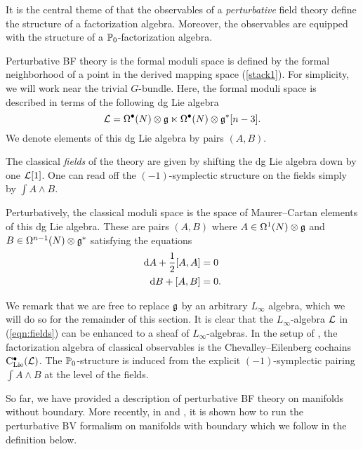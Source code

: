 \documentclass[11pt]{amsart}
\numberwithin{equation}{section}
\begin{document}
It is the central theme of \cite{CG1, CG2} that the observables of a {\em perturbative} field theory define the structure of a factorization algebra. 
Moreover, the observables are equipped with the structure of a $\mathbb P_0$-factorization algebra.

Perturbative BF theory is the formal moduli space is defined by the formal neighborhood of a point in the derived mapping space (\ref{stack1}). 
For simplicity, we will work near the trivial $G$-bundle. 
Here, the formal moduli space is described in terms of the following dg Lie algebra 
\begin{equation}\label{eqn:fields}
\mathcal L = \Omega^{\bullet} (N) \otimes \mathfrak g \ltimes \Omega^{\bullet} (N) \otimes \mathfrak g^* [n-3] .
\end{equation}
We denote elements of this dg Lie algebra by pairs $(A,B)$. 

The classical {\em fields} of the theory are given by shifting the dg Lie algebra down by one $\mathcal L[1]$. 
One can read off the $(-1)$-symplectic structure on the fields simply by $\int A \wedge B$. 

Perturbatively, the classical moduli space is the space of Maurer--Cartan elements of this dg Lie algebra.
These are pairs $(A,B)$ where $A \in \Omega^1 (N) \otimes \mathfrak g$ and $B \in \Omega^{n-1} (N) \otimes \mathfrak g^*$ satisfying the equations
\begin{align*}
{\rm d} A + \frac12 [A,A] & = 0 \\
{\rm d} B + [A,B] & = 0 .
\end{align*}

We remark that we are free to replace $\mathfrak g$ by an arbitrary $L_\infty$ algebra, which we will do so for the remainder of this section. 
It is clear that the $L_\infty$-algebra $\mathcal L$ in (\ref{eqn:fields}) can be enhanced to a sheaf of $L_\infty$-algebras. 
In the setup of \cite{CG2}, the factorization algebra of classical observables is the Chevalley--Eilenberg cochains ${\rm C}_{\rm Lie}^\bullet (\mathcal L)$.   
The $\mathbb P_0$-structure is induced from the explicit $(-1)$-symplectic pairing $\int A \wedge B$ at the level of the fields. 

So far, we have provided a description of perturbative BF theory on manifolds without boundary. 
More recently, in \cite{ButsonYoo} and \cite{Eugene}, it is shown how to run the perturbative BV formalism on manifolds with boundary which we follow in the definition below. 
\end{document}
